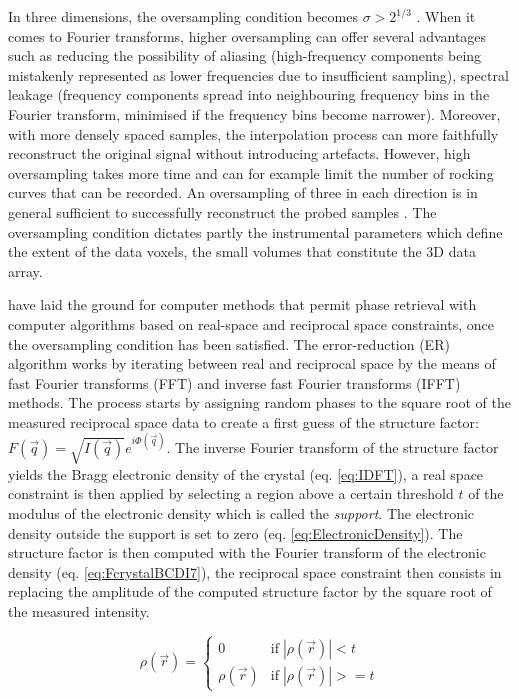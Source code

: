 In three dimensions, the oversampling condition becomes $\sigma>2^{1/3}$ \parencite{Miao1998, Miao2000, Miao2000a}.
When it comes to Fourier transforms, higher oversampling can offer several advantages such as reducing the possibility of aliasing (high-frequency components being mistakenly represented as lower frequencies due to insufficient sampling), spectral leakage (frequency components spread into neighbouring frequency bins in the Fourier transform, minimised if the frequency bins become narrower).
Moreover, with more densely spaced samples, the interpolation process can more faithfully reconstruct the original signal without introducing artefacts.
However, high oversampling takes more time and can for example limit the number of rocking curves that can be recorded.
An oversampling of three in each direction is in general sufficient to successfully reconstruct the probed samples \parencite{Dupraz2015}.
The oversampling condition dictates partly the instrumental parameters which define the extent of the data voxels, the small volumes that constitute the 3D data array.

\cite{Fienup1978, Fienup1982, Fienup1986} have laid the ground for computer methods that permit phase retrieval with computer algorithms based on real-space and reciprocal space constraints, once the oversampling condition has been satisfied.
The error-reduction (ER) algorithm works by iterating between real and reciprocal space by the means of fast Fourier transforms (FFT) and inverse fast Fourier transforms (IFFT) methods.
The process starts by assigning random phases to the square root of the measured reciprocal space data to create a first guess of the structure factor: $F(\vec{q}) = \sqrt{I(\vec{q})}e^{i\Phi(\vec{q})}$.
The inverse Fourier transform of the structure factor yields the Bragg electronic density of the crystal (eq. \ref{eq:IDFT}), a real space constraint is then applied by selecting a region above a certain threshold $t$ of the modulus of the electronic density which is called the \textit{support}.
The electronic density outside the support is set to zero (eq. \ref{eq:ElectronicDensity}).
The structure factor is then computed with the Fourier transform of the electronic density (eq. \ref{eq:FcrystalBCDI7}), the reciprocal space constraint then consists in replacing the amplitude of the computed structure factor by the square root of the measured intensity.

\begin{equation}
    \label{eq:ElectronicDensity}
    \rho(\vec{r}) =
        \begin{cases}
            0  & \text{if} \; |\rho(\vec{r})| < t \\
            \rho(\vec{r}) & \text{if}  \; |\rho(\vec{r})| >= t
        \end{cases}
\end{equation}

